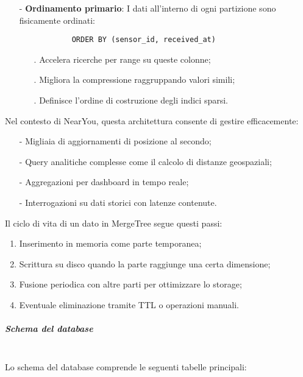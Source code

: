 \documentclass[10pt]{article}
\newcommand{\mysubparagraph}[1]{\subparagraph{#1}\mbox{}\\}
\begin{document}
\begin{itemize}
            \item[-] \textbf{Ordinamento primario}: I dati all'interno di ogni partizione sono fisicamente ordinati:
            \begin{lstlisting}
            ORDER BY (sensor_id, received_at)
            \end{lstlisting}
            \begin{itemize}
                \item[.] Accelera ricerche per range su queste colonne;
                \item[.] Migliora la compressione raggruppando valori simili;
                \item[.] Definisce l'ordine di costruzione degli indici sparsi.
            \end{itemize}
        \end{itemize}
        
        Nel contesto di NearYou, questa architettura consente di gestire efficacemente:
        \begin{itemize}
            \item[-] Migliaia di aggiornamenti di posizione al secondo;
            \item[-] Query analitiche complesse come il calcolo di distanze geospaziali;
            \item[-] Aggregazioni per dashboard in tempo reale;
            \item[-] Interrogazioni su dati storici con latenze contenute.
        \end{itemize}
        
        Il ciclo di vita di un dato in MergeTree segue questi passi:
        \begin{enumerate}
            \item Inserimento in memoria come parte temporanea;
            \item Scrittura su disco quando la parte raggiunge una certa dimensione;
            \item Fusione periodica con altre parti per ottimizzare lo storage;
            \item Eventuale eliminazione tramite TTL o operazioni manuali.
        \end{enumerate}
        
        \mysubparagraph{Schema del database}
        Lo schema del database comprende le seguenti tabelle principali:
        
\end{document}
